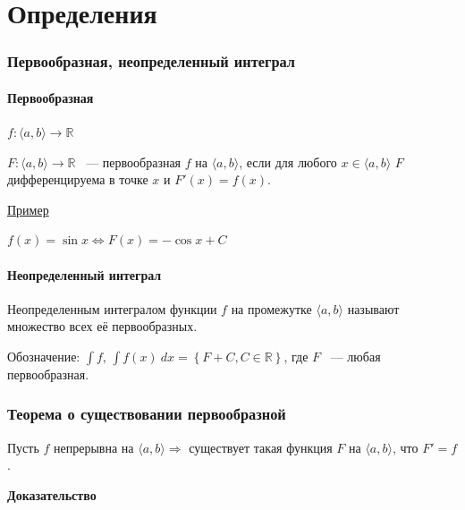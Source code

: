 \documentclass{article}
\begin{document}
\newcommand{\PG}[0]{\Pi\Gamma}
\newcommand{\Segm}[0]{\mathrm{Segm} $\ $}
\newcommand{\diam}[0]{\mathrm{diam} $\ $}

\tableofcontents

\newpage 

\part{Определения}

	\newpage
	
	\section{Первообразная, неопределенный интеграл}
	
		\subsection{Первообразная}
	
			$f: \langle a, b \rangle \rightarrow \mathbb{R}$
	
			$F: \langle a, b \rangle \rightarrow \mathbb{R}$ ~--- первообразная $f$ на $\langle a, b \rangle$, если для любого $x \in \langle a, b \rangle$ $F$ дифференцируема в точке $x$ и $F'(x) = f(x)$.
	
			\underline{Пример}
	
			$f(x) = \sin{x} \Longleftrightarrow F(x) = -\cos{x} + C$
	
		\subsection{Неопределенный интеграл}
	
			Неопределенным интегралом функции $f$ на промежутке $\langle a, b \rangle$ называют множество всех её первообразных.
			
			Обозначение: $\int{f}$, $\int{f(x)~dx} = \left\{ F + C, C \in \mathbb{R} \right\}$, где $F$ ~--- любая первообразная.
		
	\newpage
		
	\section{Теорема о существовании первообразной}
		
		Пусть $f$ непрерывна на $\langle a, b \rangle \Longrightarrow$ существует такая функция $F$ на $\langle a, b \rangle$, что $F' = f$.
		
		\textbf{Доказательство}
			
\end{document}
